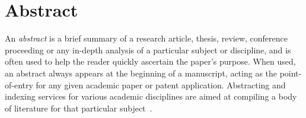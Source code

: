 %
%

\section*{Abstract}

An \emph{abstract} is a brief summary of a research article, thesis, review, 
conference proceeding or any in-depth analysis of a particular subject or 
discipline, and is often used to help the reader quickly ascertain the paper's 
purpose. When used, an abstract always appears at the beginning of a manuscript, 
acting as the point-of-entry for any given academic paper or patent application. 
Abstracting and indexing services for various academic disciplines are aimed at 
compiling a body of literature for that particular subject~\cite{wiki:abstract_en}.


